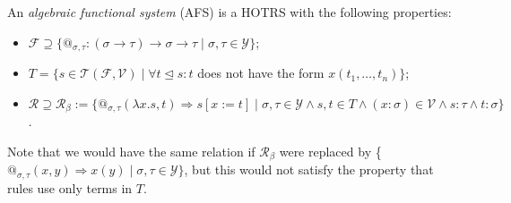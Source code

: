 \documentclass{lmcs}
\theoremstyle{theorem}\newtheorem{theorem}{Theorem}
\theoremstyle{theorem}\newtheorem{lemma}[theorem]{Lemma}
\theoremstyle{theorem}\newtheorem{corollary}[theorem]{Corollary}
\theoremstyle{definition}\newtheorem{definition}[theorem]{Definition}
\theoremstyle{definition}\newtheorem{example}[theorem]{Example}
\newcommand{\F}{\mathcal{F}}
\newcommand{\V}{\mathcal{V}}
\newcommand{\Types}{\mathcal{Y}}
\newcommand{\Terms}{\mathcal{T}}
\newcommand{\Rules}{\mathcal{R}}
\newcommand{\avar}{x}
\newcommand{\bvar}{y}
\newcommand{\abs}[2]{\lambda #1.#2}
\newcommand{\arrtype}{\rightarrow}
\newcommand{\arrz}{\Rightarrow}
\newcommand{\subtermeq}{\unlhd}
\begin{document}
An \emph{algebraic functional system} (AFS) is a HOTRS with the following properties:
\begin{itemize}
\item $\F \supseteq \{ @_{\sigma,\tau} : (\sigma \arrtype \tau) \arrtype \sigma \arrtype \tau
  \mid \sigma,\tau \in \Types \}$;
\item $T = \{ s \in \Terms(\F,\V) \mid \forall t \subtermeq s: t$ does not have the form
  $\avar(t_1,\dots,t_n)\}$;
\item $\Rules \supseteq \Rules_\beta := \{ @_{\sigma,\tau}(\abs{\avar}{s},t) \arrz s[\avar:=t] \mid
  \sigma,\tau \in \Types \wedge s,t \in T \wedge (\avar : \sigma) \in \V \wedge s : \tau \wedge
  t : \sigma \}$.
\end{itemize}
Note that we would have the same relation if $\Rules_\beta$ were replaced by \{
$@_{\sigma,\tau}(\avar,\bvar) \arrz \avar(\bvar) \mid \sigma,\tau \in \Types \}$, but this would not
satisfy the property that rules use only terms in $T$.
\end{document}
